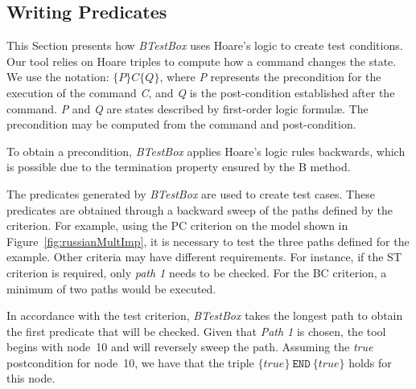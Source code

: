 \documentclass[runningheads]{llncs}
\begin{document}
\subsection{Writing Predicates} \label{writingPredicates}

This Section presents how \textit{BTestBox} uses Hoare's logic to create test conditions. 
Our tool relies on Hoare triples to compute how a command changes the state. 
We use the notation: $\{P\} C \{Q\}$, where
\textit{P} represents the precondition for the execution of the command \textit{C}, and \textit{Q} is the post-condition established after the command. 
\textit{P} and \textit{Q} are states described by first-order logic formul\ae. 
The precondition may be computed from the command and post-condition. 

To obtain a precondition, \textit{BTestBox} applies Hoare's logic rules backwards, which is possible due to the termination property ensured by the B method. 


The predicates generated by \textit{BTestBox} are used to create test cases. 
These predicates are obtained through a backward sweep of the paths defined by the criterion. 
For example, using the PC criterion on the model shown in Figure~\ref{fig:russianMultImp}, it is necessary to test the three paths defined for the example. 
Other criteria may have different requirements.
For instance, if the ST criterion is required, only \textit{path 1} needs to be checked.
For the BC criterion, a minimum of two paths would be executed.

In accordance with the test criterion, \textit{BTestBox} takes the longest path to obtain the first predicate that will be checked. 
Given that \textit{Path 1} is chosen, the tool begins with node~10 and will reversely sweep the path.
Assuming the \textit{true} postcondition for node~10, we have that the triple $\{true\}\ \texttt{END}\ \{true\}$ holds for this node.
\end{document}
